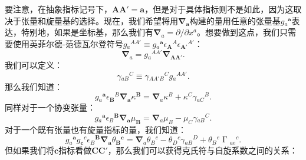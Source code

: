要注意，在抽象指标记号下，$\boldsymbol{AA} '=\boldsymbol{a}$，但是对于具体指标则不是如此，因为这取决于张量和旋量基的选择。现在，我们希望将用$\boldsymbol{\nabla }_{\boldsymbol{a}}$构建的量用任意的张量基$g{_{a}}^{\boldsymbol{a}}$表达，特别地，如果是坐标基，那么我们有$\boldsymbol{\nabla }_{a} =\partial /\partial x^{a}$。想要做到这点，我们只需要使用英菲尔德-范德瓦尔登符号$g{_{a}}^{AA'} \equiv g{_{a}}^{\boldsymbol{a}} \epsilon {_{\boldsymbol{A}}}^{A} \epsilon {_{\boldsymbol{A} '}}^{A'}$：
\begin{equation*}
	\boldsymbol{\nabla }_{a} =g{_{a}}^{AA'}\boldsymbol{\nabla }_{\boldsymbol{AA} '} .
\end{equation*}
我们可以定义：
\begin{equation*}
	\gamma {_{aB}}^{C} \equiv \gamma {_{AA'B}}^{C} g{_{a}}^{AA'} .
\end{equation*}
那么我们知道：
\begin{equation*}
	g{_{a}}^{\boldsymbol{a}} \epsilon {_{\boldsymbol{B}}}^{B}\boldsymbol{\nabla }_{\boldsymbol{a}} \kappa ^{\boldsymbol{B}} =\boldsymbol{\nabla }_{a} \kappa ^{B} +\kappa ^{C} \gamma {_{aC}}^{B} .
\end{equation*}
同样对于一个协变张量：
\begin{equation*}
	g{_{a}}^{\boldsymbol{a}} \epsilon {_{B}}^{\boldsymbol{B}}\boldsymbol{\nabla }_{\boldsymbol{a}} \mu _{\boldsymbol{B}} =\boldsymbol{\nabla }_{a} \mu _{B} -\mu _{C} \gamma {_{aB}}^{C} .
\end{equation*}
对于一个既有张量也有旋量指标的量，我们知道：
\begin{equation*}
	g{_{a}}^{\boldsymbol{a}} g{_{\boldsymbol{c}}}^{c} \epsilon {_{B}}^{\boldsymbol{B}}\boldsymbol{\nabla }_{\boldsymbol{a}} \theta {_{\boldsymbol{B}}}^{\boldsymbol{c}} =\boldsymbol{\nabla }_{a} \theta {_{B}}^{c} -\theta {_{D}}^{c} \gamma {_{aB}}^{D} +\theta {_{B}}^{e} \upGamma {_{ae}}^{c} .
\end{equation*}
但如果我们将$\boldsymbol{c}$指标看做$\boldsymbol{CC} '$，那么我们可以获得克氏符与自旋系数之间的关系：
